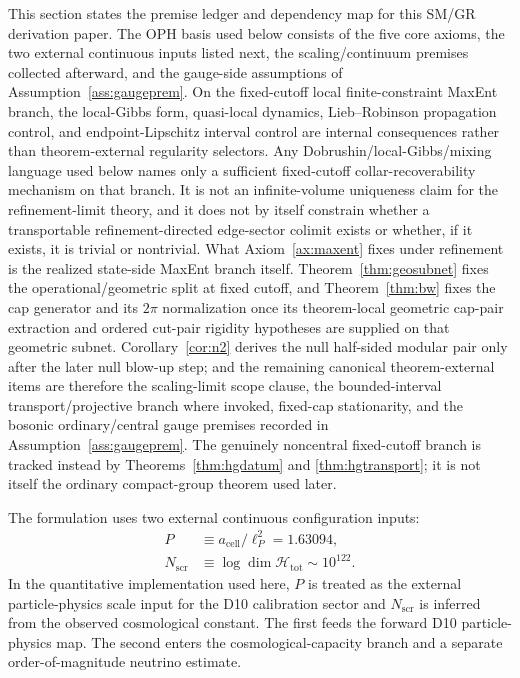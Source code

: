 \documentclass[11pt]{article}
\begin{document}
This section states the premise ledger and dependency map for this SM/GR derivation paper. The OPH basis used below consists of the five core axioms, the two external continuous inputs listed next, the scaling/continuum premises collected afterward, and the gauge-side assumptions of Assumption~\ref{ass:gaugeprem}. On the fixed-cutoff local finite-constraint MaxEnt branch, the local-Gibbs form, quasi-local dynamics, Lieb--Robinson propagation control, and endpoint-Lipschitz interval control are internal consequences rather than theorem-external regularity selectors. Any Dobrushin/local-Gibbs/mixing language used below names only a sufficient fixed-cutoff collar-recoverability mechanism on that branch. It is not an infinite-volume uniqueness claim for the refinement-limit theory, and it does not by itself constrain whether a transportable refinement-directed edge-sector colimit exists or whether, if it exists, it is trivial or nontrivial. What Axiom~\ref{ax:maxent} fixes under refinement is the realized state-side MaxEnt branch itself. Theorem~\ref{thm:geosubnet} fixes the operational/geometric split at fixed cutoff, and Theorem~\ref{thm:bw} fixes the cap generator and its \(2\pi\) normalization once its theorem-local geometric cap-pair extraction and ordered cut-pair rigidity hypotheses are supplied on that geometric subnet. Corollary~\ref{cor:n2} derives the null half-sided modular pair only after the later null blow-up step; and the remaining canonical theorem-external items are therefore the scaling-limit scope clause, the bounded-interval transport/projective branch where invoked, fixed-cap stationarity, and the bosonic ordinary/central gauge premises recorded in Assumption~\ref{ass:gaugeprem}. The genuinely noncentral fixed-cutoff branch is tracked instead by Theorems~\ref{thm:hgdatum} and \ref{thm:hgtransport}; it is not itself the ordinary compact-group theorem used later.

The formulation uses two external continuous configuration inputs:
\begin{align}
P &\equiv a_{\mathrm{cell}}/\ell_P^2 = 1.63094,\\
N_{\mathrm{scr}} &\equiv \log \dim \mathcal H_{\mathrm{tot}} \sim 10^{122}.
\end{align}
In the quantitative implementation used here, \(P\) is treated as the external particle-physics scale input for the D10 calibration sector and \(N_{\mathrm{scr}}\) is inferred from the observed cosmological constant. The first feeds the forward D10 particle-physics map. The second enters the cosmological-capacity branch and a separate order-of-magnitude neutrino estimate.
\end{document}

